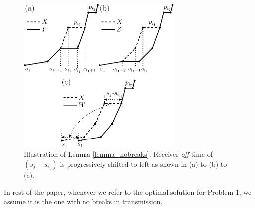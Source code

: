 \begin{figure}[htb]
  \centering
  \centerline{\includegraphics[width=8cm]{Lemma2_modified.eps}}
\caption{Illustration of Lemma \ref{lemma_nobreaks}. Receiver \textit{off} time of $(s_{j}-s_{i_1})$ is progressively shifted to left as shown in (a) to (b) to (c).}\label{fig_Lemma2}
\end{figure}
In rest of the paper, whenever we refer to the optimal solution for Problem 1, we assume it is the one with no breaks in transmission.
%
%
%
